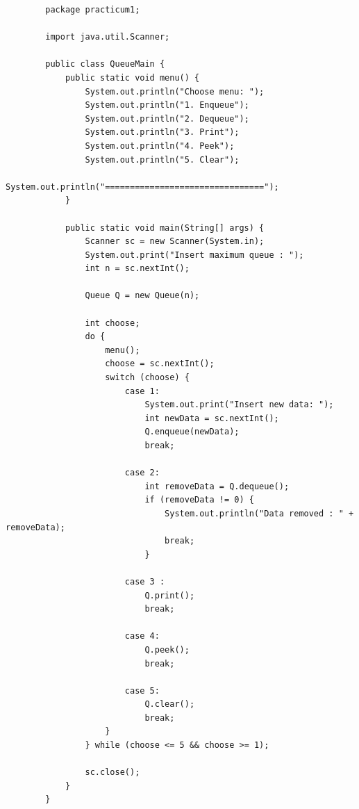 \documentclass[12pt,titlepage]{article}
\begin{document}
\begin{enumerate}
    \begin{verbatim}
        package practicum1;

        import java.util.Scanner;

        public class QueueMain {
            public static void menu() {
                System.out.println("Choose menu: ");
                System.out.println("1. Enqueue");
                System.out.println("2. Dequeue");
                System.out.println("3. Print");
                System.out.println("4. Peek");
                System.out.println("5. Clear");
                System.out.println("================================");
            }

            public static void main(String[] args) {
                Scanner sc = new Scanner(System.in);
                System.out.print("Insert maximum queue : ");
                int n = sc.nextInt();

                Queue Q = new Queue(n);

                int choose;
                do {
                    menu();
                    choose = sc.nextInt();
                    switch (choose) {
                        case 1:
                            System.out.print("Insert new data: ");
                            int newData = sc.nextInt();
                            Q.enqueue(newData);
                            break;
                        
                        case 2:
                            int removeData = Q.dequeue();
                            if (removeData != 0) {
                                System.out.println("Data removed : " + removeData);
                                break;
                            }
                    
                        case 3 :
                            Q.print();
                            break;
                        
                        case 4:
                            Q.peek();
                            break;

                        case 5:
                            Q.clear();
                            break;
                    }
                } while (choose <= 5 && choose >= 1);

                sc.close();
            }
        }
    \end{verbatim}
\end{enumerate}
\end{document}
